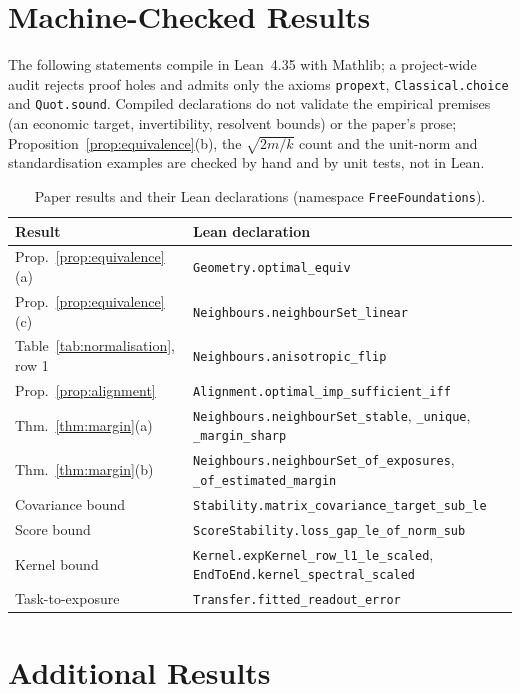 \documentclass[letterpaper]{article} %
\theoremstyle{definition}
\begin{document}
\section{Machine-Checked Results}\label{app:lean}
The following statements compile in Lean~4.35 with Mathlib; a project-wide
audit rejects proof holes and admits only the axioms \texttt{propext},
\texttt{Classical.choice} and \texttt{Quot.sound}. Compiled declarations do not
validate the empirical premises (an economic target, invertibility, resolvent
bounds) or the paper's prose; Proposition~\ref{prop:equivalence}(b),
the $\sqrt{2m/k}$ count and the unit-norm and standardisation examples are
checked by hand and by unit tests, not in Lean.
\begin{table}[t]
\centering\small
  \begin{tabular}{@{}ll@{}}
    \toprule
    Result & Lean declaration\\
    \midrule
    Prop.~\ref{prop:equivalence}(a) & \texttt{Geometry.optimal\_equiv}\\
    Prop.~\ref{prop:equivalence}(c) & \texttt{Neighbours.neighbourSet\_linear}\\
    Table~\ref{tab:normalisation}, row 1 & \texttt{Neighbours.anisotropic\_flip}\\
    Prop.~\ref{prop:alignment} & \texttt{Alignment.optimal\_imp\_sufficient\_iff}\\
    Thm.~\ref{thm:margin}(a) & \texttt{Neighbours.neighbourSet\_stable}, \texttt{\_unique}, \texttt{\_margin\_sharp}\\
    Thm.~\ref{thm:margin}(b) & \texttt{Neighbours.neighbourSet\_of\_exposures}, \texttt{\_of\_estimated\_margin}\\
    Covariance bound & \texttt{Stability.matrix\_covariance\_target\_sub\_le}\\
    Score bound & \texttt{ScoreStability.loss\_gap\_le\_of\_norm\_sub}\\
    Kernel bound & \texttt{Kernel.expKernel\_row\_l1\_le\_scaled}, \texttt{EndToEnd.kernel\_spectral\_scaled}\\
    Task-to-exposure & \texttt{Transfer.fitted\_readout\_error}\\
    \bottomrule
  \end{tabular}
  \caption{Paper results and their Lean declarations (namespace
    \texttt{FreeFoundations}).}
  \label{tab:lean}
\end{table}

\section{Additional Results}\label{app:results}
\begin{table}[h]
  \centering\small
  
  \caption{In-sample results from the same study (not out of sample): spatial
    lag coefficient of quarterly co-movement panels with period effects,
    2011--2025, and Spearman Mantel correlation of each distance with the chord
    distance of realised excess-return correlations, 2016--2025. 10-NN
    networks; Mantel permutation $p$-values all sit at the Holm-adjusted floor
    of 999 permutations.}
  \label{tab:insample}
\end{table}
\end{document}
